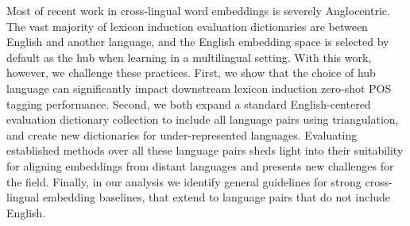 Most of recent work in cross-lingual word embeddings is severely Anglocentric. The vast majority of lexicon induction evaluation dictionaries are between English and another language, and the English embedding space is selected by default as the hub when learning in a multilingual setting. With this work, however, we challenge these practices. First, we show that the choice of hub language can significantly impact downstream lexicon induction zero-shot POS tagging performance. Second, we both expand a standard English-centered evaluation dictionary collection to include all language pairs using triangulation, and create new dictionaries for under-represented languages. Evaluating established methods over all these language pairs sheds light into their suitability for aligning embeddings from distant languages and presents new challenges for the field. Finally, in our analysis we identify general guidelines for strong cross-lingual embedding baselines, that extend to language pairs that do not include English.
